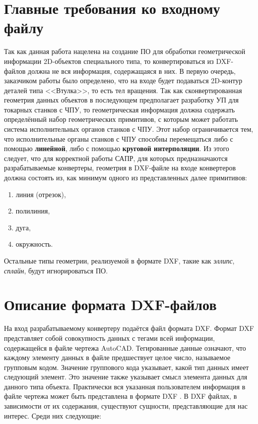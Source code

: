 \section{Главные требования ко входному файлу}

Так как данная работа нацелена на создание ПО для обработки геометрической информации 2D-объектов специального типа, то конвертироваться из DXF-файлов должна не вся информация, содержащаяся в них. В первую очередь, заказчиком работы было определено, что на входе будет подаваться 2D-контур деталей типа <<Втулка>>, то есть тел вращения. Так как сконвертированная геометрия данных объектов в последующем предполагает разработку УП для токарных станков с ЧПУ, то геометрическая информация должна содержать определённый набор геометрических примитивов, с которым может работать система исполнительных органов станков с ЧПУ. Этот набор ограничивается тем, что исполнительные органы станков с ЧПУ способны перемещаться либо с помощью \textbf{линейной}, либо с помощью \textbf{круговой интерполяции}. Из этого следует, что для корректной работы САПР, для которых предназначаются разрабатываемые конвертеры, геометрия в DXF-файле на входе конвертеров должна состоять из, как минимум одного из представленных далее примитивов:

\begin{enumerate}
	\item линия (отрезок),
	\item полилиния,
	\item дуга,
	\item окружность.
\end{enumerate}

Остальные типы геометрии, реализуемой в формате DXF, такие как \textit{эллипс}, \textit{сплайн}, будут игнорироваться ПО.

\section{Описание формата DXF-файлов}\label{sec:allaboutdxf}

На вход разрабатываемому конвертеру подаётся файл формата DXF. Формат DXF представляет собой совокупность данных с тегами всей информации, содержащейся в файле чертежа AutoCAD. Тегированные данные означают, что каждому элементу данных в файле предшествует целое число, называемое групповым кодом. Значение группового кода указывает, какой тип данных имеет следующий элемент. Это значение также указывает смысл элемента данных для данного типа объекта. Практически вся указанная пользователем информация в файле чертежа может быть представлена в формате DXF \cite{Autodesk}.
В DXF файлах, в зависимости от их содержания, существуют сущности, представляющие для нас интерес. Среди них следующие:

